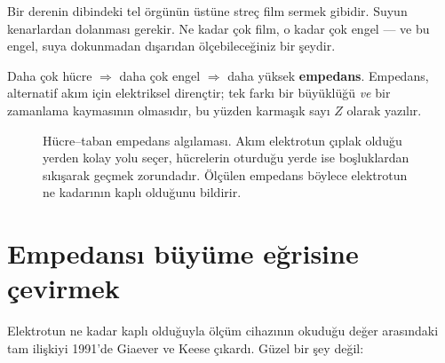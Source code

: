 \documentclass[11pt,a4paper]{article}
\begin{document}
\begin{analogy}
Bir derenin dibindeki tel örgünün üstüne streç film sermek gibidir. Suyun
kenarlardan dolanması gerekir. Ne kadar çok film, o kadar çok engel --- ve bu
engel, suya dokunmadan dışarıdan ölçebileceğiniz bir şeydir.
\end{analogy}

Daha çok hücre $\Rightarrow$ daha çok engel $\Rightarrow$ daha yüksek
\textbf{empedans}. Empedans, alternatif akım için elektriksel dirençtir; tek
farkı bir büyüklüğü \emph{ve} bir zamanlama kaymasının olmasıdır, bu yüzden
karmaşık sayı $Z$ olarak yazılır.

\begin{figure}[h]
\centering
{}
\caption{Hücre--taban empedans algılaması. Akım elektrotun çıplak olduğu yerden
kolay yolu seçer, hücrelerin oturduğu yerde ise boşluklardan sıkışarak geçmek
zorundadır. Ölçülen empedans böylece elektrotun ne kadarının kaplı olduğunu
bildirir.}
\end{figure}

\section{Empedansı büyüme eğrisine çevirmek}

Elektrotun ne kadar kaplı olduğuyla ölçüm cihazının okuduğu değer arasındaki tam
ilişkiyi 1991'de Giaever ve Keese çıkardı. Güzel bir şey değil:
\end{document}
